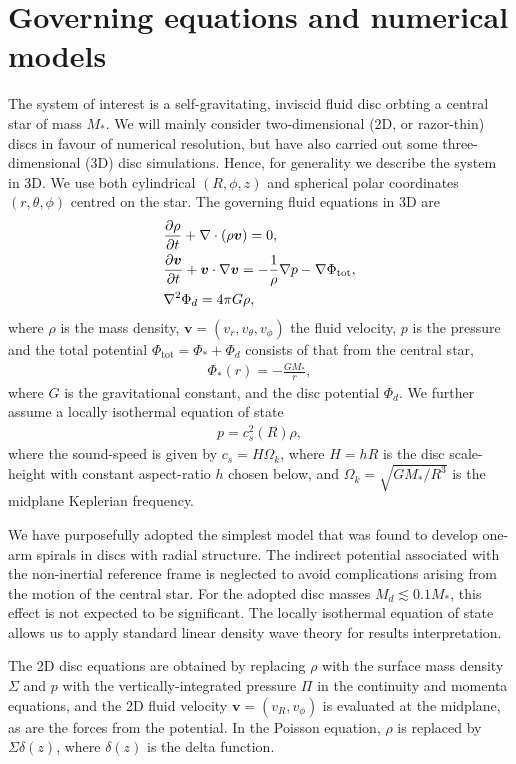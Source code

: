 \section{Governing equations and numerical models}\label{model} 
The system of interest is a self-gravitating, inviscid fluid disc
orbting a central star of mass $M_*$. We will mainly consider two-dimensional
(2D, or razor-thin) discs in favour of numerical
resolution, but have also carried out some three-dimensional (3D) disc
simulations. Hence, for generality we describe the system in
3D. We use both cylindrical $(R,\phi,z)$ and spherical polar
coordinates $(r,\theta,\phi)$ centred on the star. 
The governing fluid equations in 3D are  
\begin{align}
  &\frac{\partial\rho}{\partial t} + \nabla\cdot\left(\rho\bm{v}\right) =
  0,\label{cont_eq}\\
  &\frac{\partial\bm{v}}{\partial t} + \bm{v}\cdot\nabla\bm{v} = -\frac{1}{\rho}\nabla
  p -\nabla \Phi_\mathrm{tot}\label{mom_eq},\\ 
  & \nabla^2\Phi_d = 4 \pi G \rho \label{poisson}, 
\end{align}
where $\rho$ is the mass density, $\bm{v}=(v_r,v_\theta,v_\phi)$ the
fluid velocity, $p$ is the pressure and the total potential
$\Phi_\mathrm{tot} = \Phi_* + \Phi_d$ consists of that from the
central star, 
\begin{align}
  \Phi_*(r) = -\frac{GM_*}{r}, 
\end{align}
where $G$ is the gravitational constant,  and the disc potential
$\Phi_d$. We further assume a locally 
isothermal equation of state 
\begin{align}
  p = c_s^2(R)\rho,
\end{align}
where the sound-speed is given by $c_s=H\Omega_k$, where $H=hR$ is the
disc scale-height with constant aspect-ratio $h$ chosen below, and
$\Omega_k=\sqrt{GM_*/R^3}$ is the midplane Keplerian frequency.  

We have purposefully adopted the simplest model that was found to
develop one-arm spirals in discs with radial structure. The indirect
potential associated with the non-inertial reference frame is
neglected to avoid complications arising from the motion of the
central star. For the adopted disc masses $M_d\lesssim 0.1 M_*$, this
effect is not expected to be significant. The locally isothermal
equation of state allows us to apply standard linear density wave
theory for results interpretation. 

The 2D disc equations are obtained by replacing $\rho$ with the surface
mass density $\Sigma$ and $p$ with the vertically-integrated pressure
$\Pi$ in the continuity and momenta equations, and the 2D fluid
velocity $\bm{v}=(v_R,v_\phi)$ is evaluated at the midplane, as are
the forces from the potential. In the Poisson equation, $\rho$ is
replaced by $\Sigma\delta(z)$, where $\delta(z)$ is the
delta function. 

